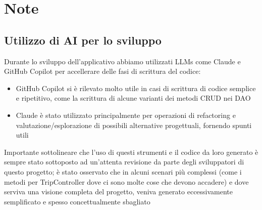 \section{Note}
\subsection{Utilizzo di AI per lo sviluppo}
Durante lo sviluppo dell'applicativo abbiamo utilizzati LLMs come Claude e GitHub Copilot per accellerare delle fasi di scrittura del codice:
\begin{itemize}
    \item GitHub Copilot si è rilevato molto utile in casi di scrittura di codice semplice e ripetitivo, come la scrittura di alcune varianti dei metodi CRUD nei DAO
    \item Claude è stato utilizzato principalmente per operazioni di refactoring e valutazione/esplorazione di possibili alternative progettuali, fornendo spunti utili
\end{itemize}
Importante sottolineare che l'uso di questi strumenti e il codice da loro generato è sempre stato sottoposto ad un'attenta revisione da parte degli sviluppatori di questo progetto; è stato osservato che in alcuni scenari più complessi (come i metodi per TripController dove ci sono molte cose che devono accadere) e dove serviva una visione completa del progetto, veniva generato eccessivamente semplificato e spesso concettualmente sbagliato
